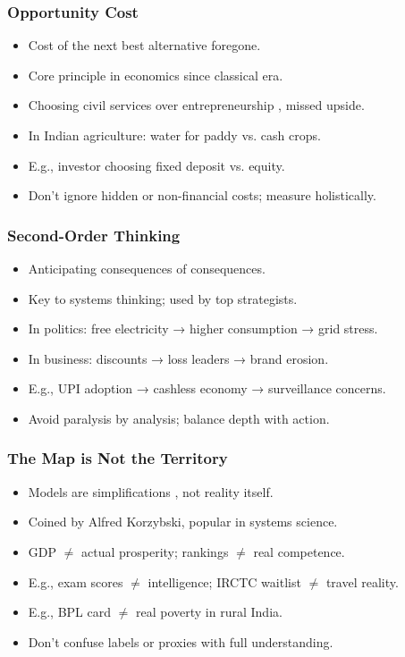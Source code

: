 \begin{frame}[fragile]\frametitle{Opportunity Cost}
  \begin{itemize}
    \item Cost of the next best alternative foregone.
    \item Core principle in economics since classical era.
    \item Choosing civil services over entrepreneurship , missed upside.
    \item In Indian agriculture: water for paddy vs. cash crops.
    \item E.g., investor choosing fixed deposit vs. equity.
    \item Don't ignore hidden or non-financial costs; measure holistically.
  \end{itemize}
\end{frame}

\begin{frame}[fragile]\frametitle{Second-Order Thinking}
  \begin{itemize}
    \item Anticipating consequences of consequences.
    \item Key to systems thinking; used by top strategists.
    \item In politics: free electricity → higher consumption → grid stress.
    \item In business: discounts → loss leaders → brand erosion.
    \item E.g., UPI adoption → cashless economy → surveillance concerns.
    \item Avoid paralysis by analysis; balance depth with action.
  \end{itemize}
\end{frame}

\begin{frame}[fragile]\frametitle{The Map is Not the Territory}
  \begin{itemize}
    \item Models are simplifications , not reality itself.
    \item Coined by Alfred Korzybski, popular in systems science.
    \item GDP $\neq$ actual prosperity; rankings $\neq$ real competence.
    \item E.g., exam scores $\neq$ intelligence; IRCTC waitlist $\neq$ travel reality.
    \item E.g., BPL card $\neq$ real poverty in rural India.
    \item Don't confuse labels or proxies with full understanding.
  \end{itemize}
\end{frame}

